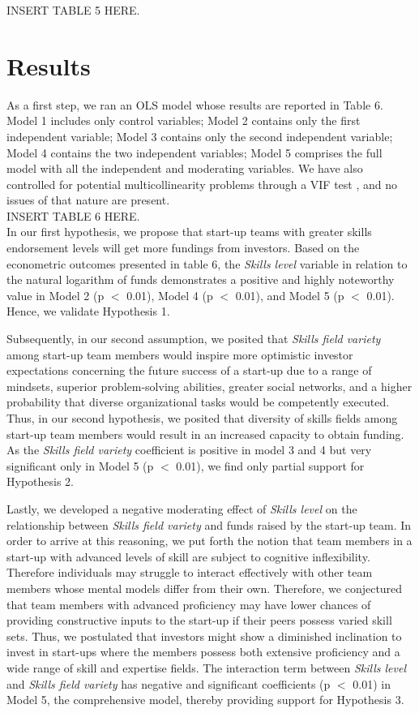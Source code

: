 \documentclass[12pt]{article}
\begin{document}
INSERT TABLE 5 HERE.

\section{Results}

As a first step, we ran an OLS model whose results are reported in Table 6\label{table6}. Model 1 includes only control variables; Model 2 contains only the first independent variable; Model 3 contains only the second independent variable; Model 4 contains the two independent variables; Model 5 comprises the full model with all the independent and moderating variables. We have also controlled for potential multicollinearity problems through a VIF test \citep{james2013introduction}, and no issues of that nature are present. \\

INSERT TABLE 6 HERE. \\

In our first hypothesis, we propose that start-up teams with greater skills endorsement levels will get more fundings from investors. Based on the econometric outcomes presented in table 6, the \textit{Skills level} variable in relation to the natural logarithm of funds demonstrates a positive and highly noteworthy value in Model 2 (p $<$ 0.01), Model 4 (p $<$ 0.01), and Model 5 (p $<$ 0.01). Hence, we validate Hypothesis 1.

Subsequently, in our second assumption, we posited that \textit{Skills field variety} among start-up team members would inspire more optimistic investor expectations concerning the future success of a start-up due to a range of mindsets, superior problem-solving abilities, greater social networks, and a higher probability that diverse organizational tasks would be competently executed. Thus, in our second hypothesis, we posited that diversity of skills fields among start-up team members would result in an increased capacity to obtain funding. As the \textit{Skills field variety} coefficient is positive in model 3 and 4 but very significant only in Model 5 (p $<$ 0.01), we find only partial support for Hypothesis 2.

Lastly, we developed a negative moderating effect of \textit{Skills level} on the relationship between \textit{Skills field variety} and funds raised by the start-up team. In order to arrive at this reasoning, we put forth the notion that team members in a start-up with advanced levels of skill are subject to cognitive inflexibility. Therefore individuals may struggle to interact effectively with other team members whose mental models differ from their own. Therefore, we conjectured that team members with advanced proficiency may have lower chances of providing constructive inputs to the start-up if their peers possess varied skill sets. Thus, we postulated that investors might show a diminished inclination to invest in start-ups where the members possess both extensive proficiency and a wide range of skill and expertise fields. The interaction term between \textit{Skills level} and \textit{Skills field variety} has negative and significant coefficients (p $<$ 0.01) in Model 5, the comprehensive model, thereby providing support for Hypothesis 3. \\
\end{document}
